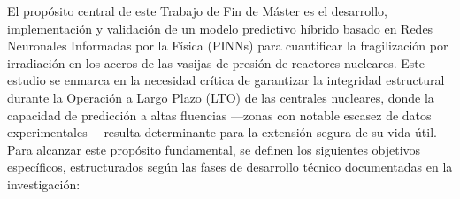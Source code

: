 \documentclass[a4paper, 12pt, twocolumn]{book}
\begin{document}
El propósito central de este Trabajo de Fin de Máster es el desarrollo, implementación y validación de un modelo predictivo híbrido basado en Redes Neuronales Informadas por la Física (PINNs) para cuantificar la fragilización por irradiación en los aceros de las vasijas de presión de reactores nucleares. Este estudio se enmarca en la necesidad crítica de garantizar la integridad estructural durante la Operación a Largo Plazo (LTO) de las centrales nucleares, donde la capacidad de predicción a altas fluencias —zonas con notable escasez de datos experimentales— resulta determinante para la extensión segura de su vida útil.\\

Para alcanzar este propósito fundamental, se definen los siguientes objetivos específicos, estructurados según las fases de desarrollo técnico documentadas en la investigación:
\end{document}
